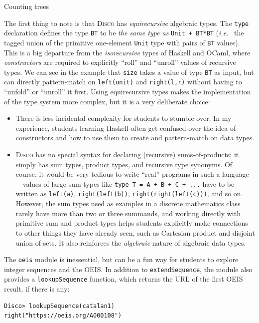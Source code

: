 \documentclass[submission,copyright,creativecommons]{eptcs}
\newcommand{\disco}{\textsc{Disco}\xspace}
\newcommand{\ie}{\emph{i.e.}\ }
\begin{document}
\begin{listing}
  \inputminted{text}{examples/catalan.disco}
  \caption{Counting trees}
  \label{lst:catalan}
\end{listing}

The first thing to note is that \disco has \emph{equirecursive}
algebraic types.  The \texttt{type} declaration defines the type
\texttt{BT} to be \emph{the same type as} \texttt{Unit + BT*BT} (\ie
the tagged union of the primitive one-element \texttt{Unit} type with
pairs of \texttt{BT} values).  This is a big departure from the
\emph{isorecursive} types of Haskell and OCaml, where
\emph{constructors} are required to explicitly ``roll'' and ``unroll''
values of recursive types.  We can see in the example that
\texttt{size} takes a value of type \texttt{BT} as input, but can
directly pattern-match on \texttt{left(unit)} and \texttt{right(l,r)}
without having to ``unfold'' or ``unroll'' it first.  Using
equirecursive types makes the implementation of the type system more
complex, but it is a very deliberate choice:
\begin{itemize}
\item There is less incidental complexity for students to stumble
  over.  In my experience, students learning Haskell often get
  confused over the idea of constructors and how to use them to create
  and pattern-match on data types.
\item \disco has no special syntax for declaring (recursive)
  sums-of-products; it simply has sum types, product types, and
  recursive type synonyms. Of course, it would be very tedious to
  write ``real'' programs in such a language---values of large sum
  types like \texttt{type T = A + B + C + ...} have to be written as
  \texttt{left(a)}, \texttt{right(left(b))},
  \texttt{right(right(left(c)))}, and so on. However, the sum types
  used as examples in a discrete mathematics class rarely have more than two
  or three summands, and working directly with primitive sum and
  product types helps students explicitly make connections to other
  things they have already seen, such as Cartesian product and
  disjoint union of sets.  It also reinforces the \emph{algebraic}
  nature of algebraic data types.
\end{itemize}

The \texttt{oeis} module is inessential, but can be a fun way for
students to explore integer sequences and the OEIS.  In addition to
\texttt{extendSequence}, the module also provides a
\texttt{lookupSequence} function, which returns the URL of the first
OEIS result, if there is any:
\begin{verbatim}
Disco> lookupSequence(catalan1)
right("https://oeis.org/A000108")
\end{verbatim}
\end{document}
